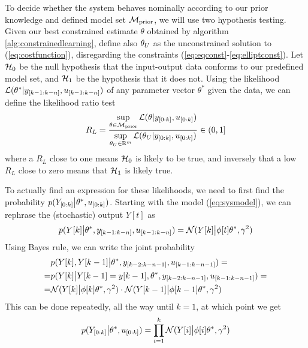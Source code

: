 
To decide whether the system behaves nominally according to our prior knowledge and
defined model set $\mathcal{M}_{\text{prior}}$, we will use two hypothesis testing.
Given our best constrained estimate $\theta$ obtained by algorithm \ref{alg:constrainedlearning},
define also $\theta_{U}$ as the unconstrained solution to (\ref{eq:costfunction}), disregarding
the constraints (\ref{eq:eqconst}-\ref{eq:elliptconst}).
Let $\mathcal{H}_0$ be the null hypothesis that the input-output data conforms to our predefined model set,
and $\mathcal{H}_1$ be the hypothesis that it does not.
Using the likelihood $\mathcal{L}(\theta^* \vert y_{[k-1:k-n]}, u_{[k-1:k-n]})$
of any parameter vector $\theta^*$ given the data, we can define the
likelihood ratio test
\begin{equation}
    R_L = \frac{\sup\limits_{\theta \in \mathcal{M}_{\text{prior}}}
    \mathcal{L}(\theta \vert y_{[0:k]}, u_{[0:k]})}
    {\sup\limits_{\theta_{U} \in \mathbb{R}^m}
    \mathcal{L}(\theta_{U} \vert y_{[0:k]}, u_{[0:k]})} \in (0,1]
\end{equation}
where a $R_L$ close to one means  $\mathcal{H}_0$ is likely to be true, and
inversely that a low $R_L$ close to zero means that $\mathcal{H}_1$ is likely true.

To actually find an expression for these likelihoods, we need to first find the probability
$p(Y_{[0:k]}\big{|}\theta^*, u_{[0:k]})$. Starting with the model (\ref{eq:sysmodel}), we
can rephrase the (stochastic) output $Y[t]$ as
\begin{equation}
    p(Y[k]\big{|} \theta^*,  y_{[k-1:k-n]}, u_{[k-1:k-n]}) =
    \mathcal{N}(Y[k]\big{|}\phi[t]\theta^*, \gamma^2)
\end{equation}
Using Bayes rule, we can write the joint probability
\begin{equation}
    \small
    \begin{aligned}
        &p(Y[k],Y[k-1]\big{|}\theta^*,y_{[k-2:k-n-1]}, u_{[k-1:k-n-1]}) = \\
        =& p(Y[k]\big{|}Y[k-1]=y[k-1], \theta^*, y_{[k-2:k-n-1]}, u_{[k-1:k-n-1]})= \\
        =& \mathcal{N}(Y[k]\big{|}\phi[k]\theta^*, \gamma^2)\cdot
        \mathcal{N}(Y[k-1]\big{|}\phi[k-1]\theta^*, \gamma^2)
\end{aligned}
\end{equation}
This can be done repeatedly, all the way until $k=1$, at which point we get
\begin{equation}
    p(Y_{[0:k]}\big{|}\theta^*, u_{[0:k]}) 
    = \prod\limits_{i=1}^k \mathcal{N}(Y[i]\big{|}\phi[i]\theta^*, \gamma^2)
\end{equation}